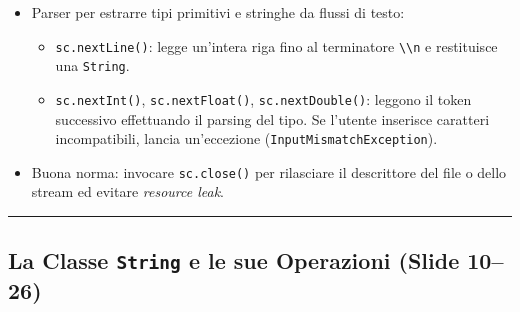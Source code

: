 \documentclass[11pt,a4paper,oneside]{report}
\newcommand{\passthrough}[1]{#1}
\providecommand{\tightlist}{\setlength{\itemsep}{0pt}\setlength{\parskip}{0pt}}
\begin{document}
\begin{itemize}
\begin{itemize}
    \begin{itemize}
    \tightlist
    \item
      Parser per estrarre tipi primitivi e stringhe da flussi di testo:

      \begin{itemize}
      \tightlist
      \item
        \passthrough{\lstinline!sc.nextLine()!}: legge un'intera riga
        fino al terminatore \passthrough{\lstinline!\\n!} e restituisce
        una \passthrough{\lstinline!String!}.
      \item
        \passthrough{\lstinline!sc.nextInt()!},
        \passthrough{\lstinline!sc.nextFloat()!},
        \passthrough{\lstinline!sc.nextDouble()!}: leggono il token
        successivo effettuando il parsing del tipo. Se l'utente
        inserisce caratteri incompatibili, lancia un'eccezione
        (\passthrough{\lstinline!InputMismatchException!}).
      \end{itemize}
    \item
      Buona norma: invocare \passthrough{\lstinline!sc.close()!} per
      rilasciare il descrittore del file o dello stream ed evitare
      \emph{resource leak}.
    \end{itemize}
  \end{itemize}
\end{itemize}

\begin{center}\rule{0.5\linewidth}{0.5pt}\end{center}

\subsection{\texorpdfstring{La Classe \texttt{String} e le sue
Operazioni (Slide
10--26)}{La Classe String e le sue Operazioni (Slide 10--26)}}\label{chap06_la-classe-string-e-le-sue-operazioni-slide-1026}
\end{document}
